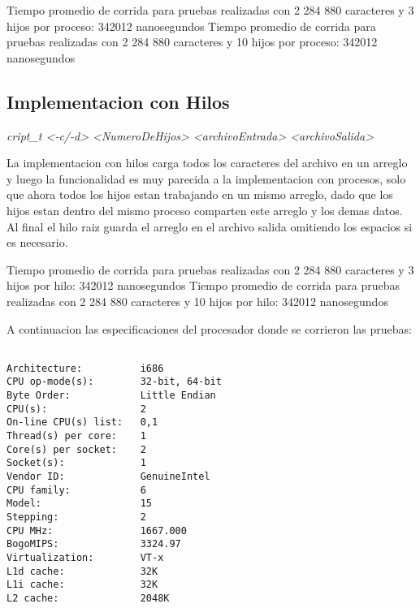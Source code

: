 \documentclass[paper=a4, fontsize=11pt]{scrartcl} %
\begin{document}
Tiempo promedio de corrida para pruebas realizadas con 2 284 880 caracteres y 3 hijos por proceso: 342012 nanosegundos
Tiempo promedio de corrida para pruebas realizadas con 2 284 880 caracteres y 10 hijos por proceso: 342012 nanosegundos


\subsection{Implementacion con Hilos}\newline

\emph{cript\_t <-c/-d> <NumeroDeHijos> <archivoEntrada> <archivoSalida>}\newline

La implementacion con hilos carga todos los caracteres del archivo en un arreglo y luego la funcionalidad es muy parecida a la implementacion con procesos, solo que ahora todos los hijos estan trabajando en un mismo arreglo, dado que los hijos estan dentro del mismo proceso comparten este arreglo y los demas datos. Al final el hilo raiz guarda el arreglo en el archivo salida omitiendo los espacios si es necesario.

Tiempo promedio de corrida para pruebas realizadas con 2 284 880 caracteres y 3 hijos por hilo: 342012 nanosegundos
Tiempo promedio de corrida para pruebas realizadas con 2 284 880 caracteres y 10 hijos por hilo: 342012 nanosegundos

A continuacion las especificaciones del procesador donde se corrieron las pruebas:

\begin{verbatim}

Architecture:          i686
CPU op-mode(s):        32-bit, 64-bit
Byte Order:            Little Endian
CPU(s):                2
On-line CPU(s) list:   0,1
Thread(s) per core:    1
Core(s) per socket:    2
Socket(s):             1
Vendor ID:             GenuineIntel
CPU family:            6
Model:                 15
Stepping:              2
CPU MHz:               1667.000
BogoMIPS:              3324.97
Virtualization:        VT-x
L1d cache:             32K
L1i cache:             32K
L2 cache:              2048K

\end{verbatim}
\end{document}
